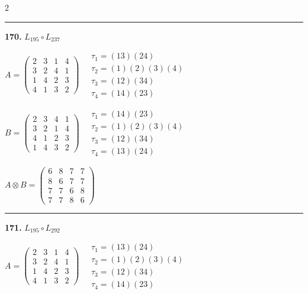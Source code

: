 \begin{multicols}{2}
\vspace{0.3em}
\hrule
\vspace{0.3em}

\noindent\textbf{170.} $L_{195} \circ L_{237}$

$A = \begin{pmatrix} 2 & 3 & 1 & 4 \\ 3 & 2 & 4 & 1 \\ 1 & 4 & 2 & 3 \\ 4 & 1 & 3 & 2 \end{pmatrix} \quad \begin{matrix} \tau_{1}=(1 3)(2 4) \\ \tau_{2}=(1)(2)(3)(4) \\ \tau_{3}=(1 2)(3 4) \\ \tau_{4}=(1 4)(2 3) \end{matrix}$

$B = \begin{pmatrix} 2 & 3 & 4 & 1 \\ 3 & 2 & 1 & 4 \\ 4 & 1 & 2 & 3 \\ 1 & 4 & 3 & 2 \end{pmatrix} \quad \begin{matrix} \tau_{1}=(1 4)(2 3) \\ \tau_{2}=(1)(2)(3)(4) \\ \tau_{3}=(1 2)(3 4) \\ \tau_{4}=(1 3)(2 4) \end{matrix}$

$A \otimes B = \begin{pmatrix} 6 & 8 & 7 & 7 \\ 8 & 6 & 7 & 7 \\ 7 & 7 & 6 & 8 \\ 7 & 7 & 8 & 6 \end{pmatrix}$

\vspace{0.3em}
\hrule
\vspace{0.3em}

\noindent\textbf{171.} $L_{195} \circ L_{292}$

$A = \begin{pmatrix} 2 & 3 & 1 & 4 \\ 3 & 2 & 4 & 1 \\ 1 & 4 & 2 & 3 \\ 4 & 1 & 3 & 2 \end{pmatrix} \quad \begin{matrix} \tau_{1}=(1 3)(2 4) \\ \tau_{2}=(1)(2)(3)(4) \\ \tau_{3}=(1 2)(3 4) \\ \tau_{4}=(1 4)(2 3) \end{matrix}$


\end{multicols}
